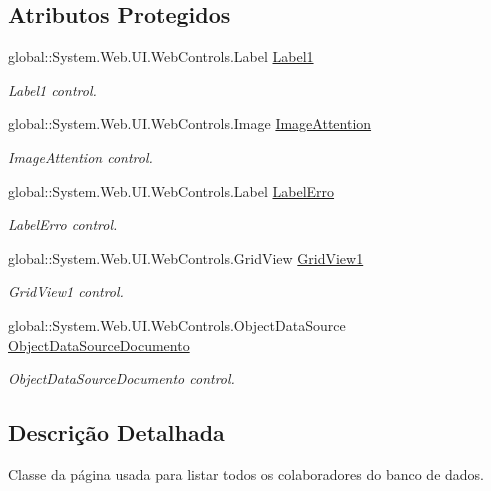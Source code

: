 \subsection*{Atributos Protegidos}
\begin{DoxyCompactItemize}
\item 
global::System.Web.UI.WebControls.Label \hyperlink{class_sistema_r_h_1_1listar_a9e923dea80a39d42e26a2ccd5e8e163f}{Label1}
\begin{DoxyCompactList}\small\item\em Label1 control. \item\end{DoxyCompactList}\item 
global::System.Web.UI.WebControls.Image \hyperlink{class_sistema_r_h_1_1listar_ad8d65c5b374cd071739c7e011d564984}{ImageAttention}
\begin{DoxyCompactList}\small\item\em ImageAttention control. \item\end{DoxyCompactList}\item 
global::System.Web.UI.WebControls.Label \hyperlink{class_sistema_r_h_1_1listar_a099249f6f879d191f79410dcf13b5027}{LabelErro}
\begin{DoxyCompactList}\small\item\em LabelErro control. \item\end{DoxyCompactList}\item 
global::System.Web.UI.WebControls.GridView \hyperlink{class_sistema_r_h_1_1listar_a48e63b5bdc208679f4a6d29b0800e40f}{GridView1}
\begin{DoxyCompactList}\small\item\em GridView1 control. \item\end{DoxyCompactList}\item 
global::System.Web.UI.WebControls.ObjectDataSource \hyperlink{class_sistema_r_h_1_1listar_adc28839cecb1dcfb2e5629dc4d78222d}{ObjectDataSourceDocumento}
\begin{DoxyCompactList}\small\item\em ObjectDataSourceDocumento control. \item\end{DoxyCompactList}\end{DoxyCompactItemize}


\subsection{Descrição Detalhada}
Classe da página usada para listar todos os colaboradores do banco de dados. 

